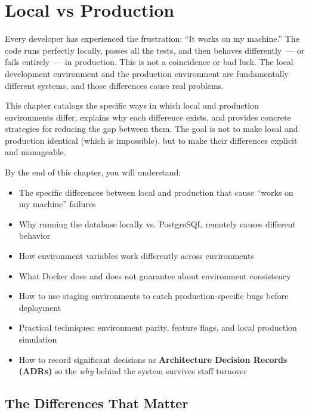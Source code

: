 \setcounter{chapter}{38}
\chapter{Local vs Production}\label{ch:39-local-vs-production}

\chapterrule

Every developer has experienced the frustration: ``It works on my machine.'' The code runs perfectly locally, passes all the tests, and then behaves differently~--- or fails entirely~--- in production. This is not a coincidence or bad luck. The local development environment and the production environment are fundamentally different systems, and those differences cause real problems.

This chapter catalogs the specific ways in which local and production environments differ, explains why each difference exists, and provides concrete strategies for reducing the gap between them. The goal is not to make local and production identical (which is impossible), but to make their differences explicit and manageable.

\begin{objectives}

By the end of this chapter, you will understand:

\begin{itemize}
\tightlist
\item
  The specific differences between local and production that cause ``works on my machine'' failures
\item
  Why running the database locally vs. PostgreSQL remotely causes different behavior
\item
  How environment variables work differently across environments
\item
  What Docker does and does not guarantee about environment consistency
\item
  How to use staging environments to catch production-specific bugs before deployment
\item
  Practical techniques: environment parity, feature flags, and local production simulation
\item
  How to record significant decisions as \textbf{Architecture Decision Records (ADRs)} so the \emph{why} behind the system survives staff turnover
\end{itemize}

\end{objectives}

\setcounter{section}{0}
\section{The Differences That Matter}\label{39-local-vs-production:391-the-differences-that-matter}

